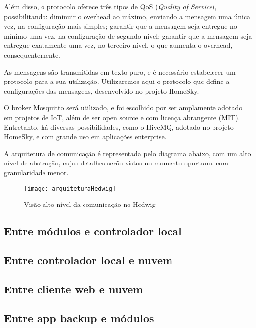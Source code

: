 Além disso, o protocolo \wmqtt{} oferece três tipos de QoS (\textit{Quality of Service}), possibilitando: diminuir o overhead ao máximo, enviando a mensagem uma única vez, na configuração mais simples; garantir que a mensagem seja entregue no mínimo uma vez, na configuração de segundo nível; garantir que a mensagem seja entregue exatamente uma vez, no terceiro nível, o que aumenta o overhead, consequentemente.

As mensagens são transmitidas em texto puro, e é necessário estabelecer um protocolo para a sua utilização. Utilizaremos aqui o protocolo que define a configurações das mensagens, desenvolvido no projeto HomeSky.

O broker Mosquitto será utilizado, e foi escolhido por ser amplamente adotado em projetos de IoT, além de ser open source e com licença abrangente (MIT). Entretanto, há diversas possibilidades, como o HiveMQ, adotado no projeto HomeSky, e com grande uso em aplicações enterprise.

A arquitetura de comunicação é representada pelo diagrama abaixo, com um alto nível de abstração, cujos detalhes serão vistos no momento oportuno, com granularidade menor.


\begin{figure}[H]
	\centering
	\caption{Visão alto nível da comunicação no Hedwig}
  \texttt{[image: arquiteturaHedwig]}
\label{fig:diagramaComunicacao}
\end{figure}

\subsection{Entre módulos e controlador local}
\subsection{Entre controlador local e nuvem}
\subsection{Entre cliente web e nuvem}
\subsection{Entre app backup e módulos}
